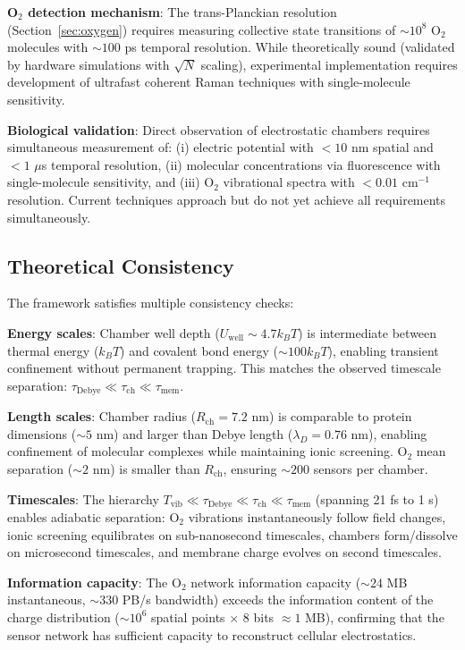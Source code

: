 \documentclass[twocolumn,10pt,aps,prd,superscriptaddress,floatfix,nofootinbib]{revtex4-2}
\theoremstyle{remark}
\begin{document}
\textbf{O$_2$ detection mechanism}: The trans-Planckian resolution (Section~\ref{sec:oxygen}) requires measuring collective state transitions of $\sim 10^8$ O$_2$ molecules with $\sim 100$ ps temporal resolution. While theoretically sound (validated by hardware simulations with $\sqrt{N}$ scaling), experimental implementation requires development of ultrafast coherent Raman techniques with single-molecule sensitivity.

\textbf{Biological validation}: Direct observation of electrostatic chambers requires simultaneous measurement of: (i) electric potential with $<10$ nm spatial and $<1$ $\mu$s temporal resolution, (ii) molecular concentrations via fluorescence with single-molecule sensitivity, and (iii) O$_2$ vibrational spectra with $<0.01$ cm$^{-1}$ resolution. Current techniques approach but do not yet achieve all requirements simultaneously.

\subsection{Theoretical Consistency}

The framework satisfies multiple consistency checks:

\textbf{Energy scales}: Chamber well depth ($U_{\mathrm{well}} \sim 4.7 k_B T$) is intermediate between thermal energy ($k_B T$) and covalent bond energy ($\sim 100 k_B T$), enabling transient confinement without permanent trapping. This matches the observed timescale separation: $\tau_{\mathrm{Debye}} \ll \tau_{\mathrm{ch}} \ll \tau_{\mathrm{mem}}$.

\textbf{Length scales}: Chamber radius ($R_{\mathrm{ch}} = 7.2$ nm) is comparable to protein dimensions ($\sim 5$ nm) and larger than Debye length ($\lambda_D = 0.76$ nm), enabling confinement of molecular complexes while maintaining ionic screening. O$_2$ mean separation ($\sim 2$ nm) is smaller than $R_{\mathrm{ch}}$, ensuring $\sim 200$ sensors per chamber.

\textbf{Timescales}: The hierarchy $T_{\mathrm{vib}} \ll \tau_{\mathrm{Debye}} \ll \tau_{\mathrm{ch}} \ll \tau_{\mathrm{mem}}$ (spanning 21 fs to 1 s) enables adiabatic separation: O$_2$ vibrations instantaneously follow field changes, ionic screening equilibrates on sub-nanosecond timescales, chambers form/dissolve on microsecond timescales, and membrane charge evolves on second timescales.

\textbf{Information capacity}: The O$_2$ network information capacity ($\sim 24$ MB instantaneous, $\sim 330$ PB/s bandwidth) exceeds the information content of the charge distribution ($\sim 10^6$ spatial points $\times$ 8 bits $\approx 1$ MB), confirming that the sensor network has sufficient capacity to reconstruct cellular electrostatics.
\end{document}
